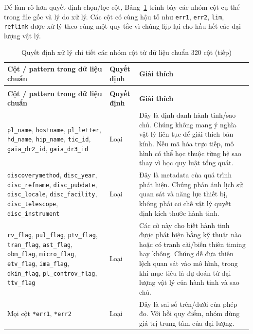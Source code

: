 Để làm rõ hơn quyết định chọn/lọc cột, Bảng~\ref{tab:part2_column_decisions} trình bày các nhóm
cột cụ thể trong file gốc và lý do xử lý. Các cột có cùng hậu tố như \texttt{err1},
\texttt{err2}, \texttt{lim}, \texttt{reflink} được xử lý theo cùng một quy tắc vì chúng lặp lại
cho hầu hết các đại lượng vật lý.

{\scriptsize
\setlength{\tabcolsep}{3pt}
\begin{longtable}{@{}p{}p{}p{}@{}}
\caption{Quyết định xử lý chi tiết các nhóm cột từ dữ liệu chuẩn 320 cột}
\label{tab:part2_column_decisions}\\
\hline
\textbf{Cột / pattern trong dữ liệu chuẩn} & \textbf{Quyết định} & \textbf{Giải thích} \\
\hline
\endfirsthead
\caption[]{Quyết định xử lý chi tiết các nhóm cột từ dữ liệu chuẩn 320 cột (tiếp)}\\
\hline
\textbf{Cột / pattern trong dữ liệu chuẩn} & \textbf{Quyết định} & \textbf{Giải thích} \\
\hline
\endhead
\texttt{pl\_name}, \texttt{hostname}, \texttt{pl\_letter},
\texttt{hd\_name}, \texttt{hip\_name}, \texttt{tic\_id}, \texttt{gaia\_dr2\_id},
\texttt{gaia\_dr3\_id}
& Loại
& Đây là định danh hành tinh/sao chủ. Chúng không mang ý nghĩa vật lý liên tục để giải thích bán
kính. Nếu mã hóa trực tiếp, mô hình có thể học thuộc từng hệ sao thay vì học quy luật tổng quát. \\
\hline
\texttt{discoverymethod}, \texttt{disc\_year}, \texttt{disc\_refname},
\texttt{disc\_pubdate}, \texttt{disc\_locale}, \texttt{disc\_facility},
\texttt{disc\_telescope}, \texttt{disc\_instrument}
& Loại
& Đây là metadata của quá trình phát hiện. Chúng phản ánh lịch sử quan sát và năng lực thiết bị,
không phải cơ chế vật lý quyết định kích thước hành tinh. \\
\hline
\texttt{rv\_flag}, \texttt{pul\_flag}, \texttt{ptv\_flag}, \texttt{tran\_flag},
\texttt{ast\_flag}, \texttt{obm\_flag}, \texttt{micro\_flag}, \texttt{etv\_flag},
\texttt{ima\_flag}, \texttt{dkin\_flag}, \texttt{pl\_controv\_flag}, \texttt{ttv\_flag}
& Loại
& Các cờ này cho biết hành tinh được phát hiện bằng kỹ thuật nào hoặc có tranh cãi/biến thiên timing
hay không. Chúng dễ đưa thiên lệch quan sát vào mô hình, trong khi mục tiêu là dự đoán từ đại lượng
vật lý của hành tinh và sao chủ. \\
\hline
Mọi cột \texttt{*err1}, \texttt{*err2}
& Loại
& Đây là sai số trên/dưới của phép đo. Với hồi quy điểm, nhóm dùng giá trị trung tâm của đại lượng.

\end{longtable}}
